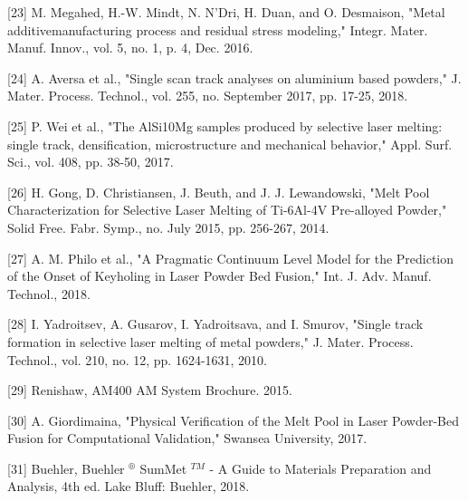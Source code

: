 \documentclass[10pt]{article}
\begin{document}
[23] M. Megahed, H.-W. Mindt, N. N'Dri, H. Duan, and O. Desmaison, "Metal additivemanufacturing process and residual stress modeling," Integr. Mater. Manuf. Innov., vol. 5, no. 1, p. 4, Dec. 2016.

[24] A. Aversa et al., "Single scan track analyses on aluminium based powders," J. Mater. Process. Technol., vol. 255, no. September 2017, pp. 17-25, 2018.

[25] P. Wei et al., "The AlSi10Mg samples produced by selective laser melting: single track, densification, microstructure and mechanical behavior," Appl. Surf. Sci., vol. 408, pp. 38-50, 2017.

[26] H. Gong, D. Christiansen, J. Beuth, and J. J. Lewandowski, "Melt Pool Characterization for Selective Laser Melting of Ti-6Al-4V Pre-alloyed Powder," Solid Free. Fabr. Symp., no. July 2015, pp. 256-267, 2014.

[27] A. M. Philo et al., "A Pragmatic Continuum Level Model for the Prediction of the Onset of Keyholing in Laser Powder Bed Fusion," Int. J. Adv. Manuf. Technol., 2018.

[28] I. Yadroitsev, A. Gusarov, I. Yadroitsava, and I. Smurov, "Single track formation in selective laser melting of metal powders," J. Mater. Process. Technol., vol. 210, no. 12, pp. 1624-1631, 2010.

[29] Renishaw, AM400 AM System Brochure. 2015.

[30] A. Giordimaina, "Physical Verification of the Melt Pool in Laser Powder-Bed Fusion for Computational Validation," Swansea University, 2017.

[31] Buehler, Buehler ${ }^{\circledR}$ SumMet ${ }^{T M}$ - A Guide to Materials Preparation and Analysis, 4th ed. Lake Bluff: Buehler, 2018.
\end{document}
